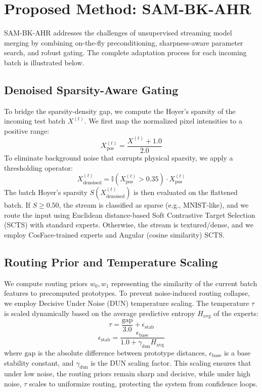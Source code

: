 \documentclass{article}
\theoremstyle{plain}
\theoremstyle{definition}
\theoremstyle{remark}
\begin{document}
\section{Proposed Method: SAM-BK-AHR}
\label{sec:method}
SAM-BK-AHR addresses the challenges of unsupervised streaming model merging by combining on-the-fly preconditioning, sharpness-aware parameter search, and robust gating. The complete adaptation process for each incoming batch is illustrated below.

\subsection{Denoised Sparsity-Aware Gating}
To bridge the sparsity-density gap, we compute the Hoyer's sparsity of the incoming test batch $X^{(t)}$. We first map the normalized pixel intensities to a positive range:
\begin{equation}
X^{(t)}_{\text{pos}} = \frac{X^{(t)} + 1.0}{2.0}
\end{equation}
To eliminate background noise that corrupts physical sparsity, we apply a thresholding operator:
\begin{equation}
X^{(t)}_{\text{denoised}} = \mathbb{I}(X^{(t)}_{\text{pos}} > 0.35) \cdot X^{(t)}_{\text{pos}}
\end{equation}
The batch Hoyer's sparsity $S(X^{(t)}_{\text{denoised}})$ is then evaluated on the flattened batch. If $S \ge 0.50$, the stream is classified as sparse (e.g., MNIST-like), and we route the input using Euclidean distance-based Soft Contrastive Target Selection (SCTS) with standard experts. Otherwise, the stream is textured/dense, and we employ CosFace-trained experts \cite{wang2018cosface} and Angular (cosine similarity) SCTS.

\subsection{Routing Prior and Temperature Scaling}
We compute routing priors $w_0, w_1$ representing the similarity of the current batch features to precomputed prototypes. To prevent noise-induced routing collapse, we employ Decisive Under Noise (DUN) temperature scaling. The temperature $\tau$ is scaled dynamically based on the average predictive entropy $H_{\text{avg}}$ of the experts:
\begin{equation}
\tau = \frac{\text{gap}}{3.0} + \epsilon_{\text{stab}}
\end{equation}
\begin{equation}
\epsilon_{\text{stab}} = \frac{\epsilon_{\text{base}}}{1.0 + \gamma_{\text{dun}} H_{\text{avg}}}
\end{equation}
where $\text{gap}$ is the absolute difference between prototype distances, $\epsilon_{\text{base}}$ is a base stability constant, and $\gamma_{\text{dun}}$ is the DUN scaling factor. This scaling ensures that under low noise, the routing priors remain sharp and decisive, while under high noise, $\tau$ scales to uniformize routing, protecting the system from confidence loops.
\end{document}
